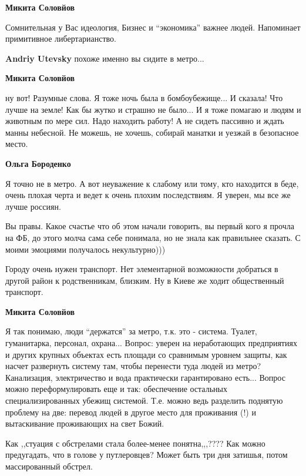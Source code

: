 \begin{itemize}
\begin{itemize}
\textbf{Микита Соловйов} 

Сомнительная у Вас идеология, Бизнес и \enquote{экономика} важнее людей.
Напоминает примитивное либертарианство.

\textbf{Andriy Utevsky} похоже именно вы сидите в метро...

\textbf{Микита Соловйов} 

ну вот! Разумные слова. Я тоже ночь была в бомбоубежище... И сказала! Что лучше
на земле! Как бы жутко и страшно не было... И я тоже помагаю и людям и животным
по мере сил. Надо находить работу! А не сидеть пассивно и ждать манны небесной.
Не можешь, не хочешь, собирай манатки и уезжай в безопасное место.

\textbf{Ольга Бороденко} 

Я точно не в метро. А вот неуважение к слабому или тому, кто находится в беде,
очень плохая черта и ведет к очень плохим последствиям. Я уверен, мы все же
лучше россиян.

\end{itemize} %


Вы правы. Какое счастье что об этом начали говорить, вы первый кого я прочла на
ФБ, до этого молча сама себе понимала, но не знала как правильнее сказать. С
моими эмоциями получалось некультурно)))


Городу очень нужен транспорт. Нет элементарной возможности добраться в другой
район к родственникам, близким. Ну в Киеве же ходит общественный транспорт.

\textbf{Микита Соловйов} 

Я так понимаю, люди \enquote{держатся} за метро, т.к. это - система. Туалет,
гуманитарка, персонал, охрана... Вопрос: уверен на неработающих предприятиях и
других крупных объектах есть площади со сравнимым уровнем защиты, как насчет
развернуть систему там, чтобы перенести туда людей из метро? Канализация,
электричество и вода практически гарантировано есть... Вопрос можно
переформулировать еще и так: обеспечение остальных специализированных убежищ
системой. Т.е. можно ведь разделить поднятую проблему на две: перевод людей в
другое место для проживания (!) и вытаскивание проживающих на свет Божий.


Как ,,стуация с обстрелами стала более-менее понятна,,,???? Как можно
предугадать, что в голове у путлеровцев? Может быть три дня затишья, потом
массированный обстрел.


\end{itemize}
